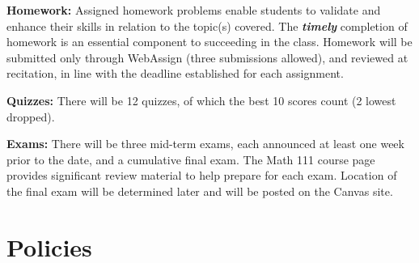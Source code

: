 \documentclass{article}
\begin{document}
\noindent \textbf{Homework:} Assigned homework problems enable students to validate and enhance their skills in relation to the topic(s) covered. The \textbf{\textit{timely}} completion of homework is an essential component to succeeding in the class. Homework will be submitted only through WebAssign (three submissions allowed), and reviewed at recitation, in line with the deadline established for each assignment. \par
\hfill \par
\noindent \textbf{Quizzes:} There will be 12 quizzes, of which the best 10 scores count (2 lowest dropped). \par
\hfill \par
\noindent \textbf{Exams:} There will be three mid-term exams, each announced at least one week prior to the date, and a cumulative final exam. The Math 111 course page provides significant review material to help prepare for each exam. Location of the final exam will be determined later and will be posted on the Canvas site. \par
\hfill \par


\section*{Policies}
\end{document}
